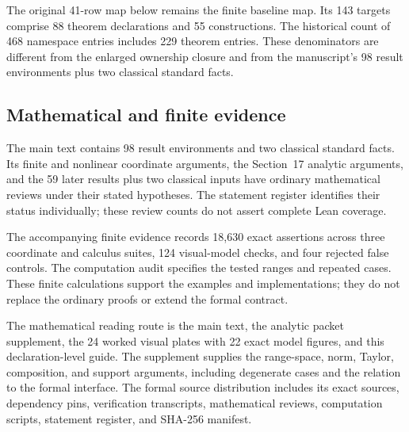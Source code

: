 The original 41-row map below remains the finite baseline map. Its 143 targets comprise 88 theorem declarations and 55 constructions. The historical count of 468 namespace entries includes 229 theorem entries. These denominators are different from the enlarged ownership closure and from the manuscript's 98 result environments plus two classical standard facts.


\subsection*{Mathematical and finite evidence}
The main text contains 98 result environments and two classical standard facts. Its finite and nonlinear coordinate arguments, the Section~17 analytic arguments, and the 59 later results plus two classical inputs have ordinary mathematical reviews under their stated hypotheses. The statement register identifies their status individually; these review counts do not assert complete Lean coverage.

The accompanying finite evidence records 18,630 exact assertions across three coordinate and calculus suites, 124 visual-model checks, and four rejected false controls. The computation audit specifies the tested ranges and repeated cases. These finite calculations support the examples and implementations; they do not replace the ordinary proofs or extend the formal contract.

The mathematical reading route is the main text, the analytic packet supplement, the 24 worked visual plates with 22 exact model figures, and this declaration-level guide. The supplement supplies the range-space, norm, Taylor, composition, and support arguments, including degenerate cases and the relation to the formal interface. The formal source distribution includes its exact sources, dependency pins, verification transcripts, mathematical reviews, computation scripts, statement register, and SHA-256 manifest.

